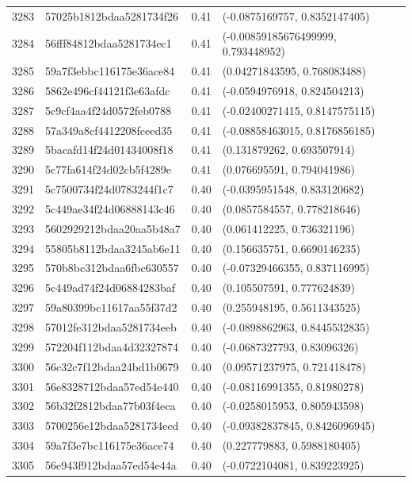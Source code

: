 \begin{table}[ht]
\begin{tabular}{rlrl}
  3283 & 57025b1812bdaa5281734f26 & 0.41 & (-0.0875169757, 0.8352147405) \\ 
  3284 & 56fff84812bdaa5281734ec1 & 0.41 & (-0.00859185676499999, 0.793448952) \\ 
  3285 & 59a7f3ebbc116175e36ace84 & 0.41 & (0.04271843595, 0.768083488) \\ 
  3286 & 5862e496cf44121f3e63afdc & 0.41 & (-0.0594976918, 0.824504213) \\ 
  3287 & 5c9cf4aa4f24d0572feb0788 & 0.41 & (-0.02400271415, 0.8147575115) \\ 
  3288 & 57a349a8cf4412208fceed35 & 0.41 & (-0.08858463015, 0.8176856185) \\ 
  3289 & 5bacafd14f24d01434008f18 & 0.41 & (0.131879262, 0.693507914) \\ 
  3290 & 5c77fa614f24d02cb5f4289e & 0.41 & (0.076695591, 0.794041986) \\ 
  3291 & 5c7500734f24d0783244f1c7 & 0.40 & (-0.0395951548, 0.833120682) \\ 
  3292 & 5c449ae34f24d06888143c46 & 0.40 & (0.0857584557, 0.778218646) \\ 
  3293 & 5602929212bdaa20aa5b48a7 & 0.40 & (0.061412225, 0.736321196) \\ 
  3294 & 55805b8112bdaa3245ab6e11 & 0.40 & (0.156635751, 0.6690146235) \\ 
  3295 & 570b8bc312bdaa6fbc630557 & 0.40 & (-0.07329466355, 0.837116995) \\ 
  3296 & 5c449ad74f24d06884283baf & 0.40 & (0.105507591, 0.777624839) \\ 
  3297 & 59a80399bc11617aa55f37d2 & 0.40 & (0.255948195, 0.5611343525) \\ 
  3298 & 57012fe312bdaa5281734eeb & 0.40 & (-0.0898862963, 0.8445532835) \\ 
  3299 & 572204f112bdaa4d32327874 & 0.40 & (-0.0687327793, 0.83096326) \\ 
  3300 & 56c32c7f12bdaa24bd1b0679 & 0.40 & (0.09571237975, 0.721418478) \\ 
  3301 & 56e8328712bdaa57ed54e440 & 0.40 & (-0.08116991355, 0.81980278) \\ 
  3302 & 56b32f2812bdaa77b03f4eca & 0.40 & (-0.0258015953, 0.805943598) \\ 
  3303 & 5700256e12bdaa5281734ecd & 0.40 & (-0.09382837845, 0.8426096945) \\ 
  3304 & 59a7f3e7bc116175e36ace74 & 0.40 & (0.227779883, 0.5988180405) \\ 
  3305 & 56e943f912bdaa57ed54e44a & 0.40 & (-0.0722104081, 0.839223925) \\ 

\end{tabular}
\end{table}
